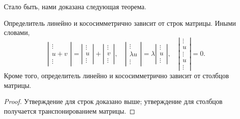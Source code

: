 Стало быть, нами доказана следующая теорема.
\begin{theorem}
Определитель линейно и кососимметрично зависит от строк матрицы. Иными
словами,
$$
\left|\begin{matrix}\vdots \\ u+v \\ \vdots\end{matrix}\right|=
\left|\begin{matrix}\vdots \\ u \\ \vdots\end{matrix}\right|+
\left|\begin{matrix}\vdots \\ v \\ \vdots\end{matrix}\right|,\quad
\left|\begin{matrix}\vdots \\ \lambda u \\ \vdots\end{matrix}\right|=
\lambda\left|\begin{matrix}\vdots \\ u \\ \vdots\end{matrix}\right|,\quad
\left|\begin{matrix}\vdots \\ u \\ \vdots \\ u \\
    \vdots\end{matrix}\right| = 0.
$$
Кроме того, определитель линейно и кососимметрично зависит от столбцов
матрицы.
\end{theorem}
\begin{proof}
Утверждение для строк доказано выше; утверждение для столбцов
получается транспонированием матрицы.
\end{proof}

